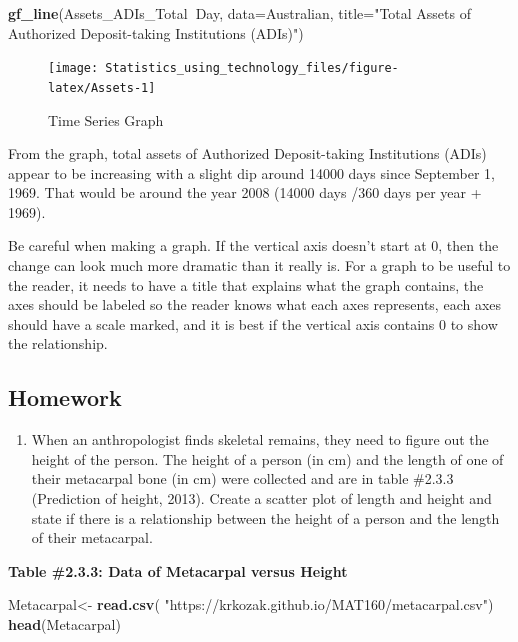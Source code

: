 \documentclass[
]{book}
\newenvironment{Shaded}{\begin{snugshade}}{\end{snugshade}}
\newcommand{\DataTypeTok}[1]{\textcolor[rgb]{0.13,0.29,0.53}{#1}}
\newcommand{\KeywordTok}[1]{\textcolor[rgb]{0.13,0.29,0.53}{\textbf{#1}}}
\newcommand{\NormalTok}[1]{#1}
\newcommand{\OperatorTok}[1]{\textcolor[rgb]{0.81,0.36,0.00}{\textbf{#1}}}
\newcommand{\StringTok}[1]{\textcolor[rgb]{0.31,0.60,0.02}{#1}}
\providecommand{\tightlist}{%
  \setlength{\itemsep}{0pt}\setlength{\parskip}{0pt}}
\begin{document}
\begin{Shaded}
\begin{Highlighting}[]
\KeywordTok{gf_line}\NormalTok{(Assets_ADIs_Total}\OperatorTok{~}\NormalTok{Day, }\DataTypeTok{data=}\NormalTok{Australian, }\DataTypeTok{title=}\StringTok{"Total Assets of Authorized Deposit-taking Institutions (ADIs)"}\NormalTok{)}
\end{Highlighting}
\end{Shaded}

\begin{figure}
\texttt{[image: Statistics\_using\_technology\_files/figure-latex/Assets-1]} \caption{Time Series Graph}\label{fig:Assets}
\end{figure}

From the graph, total assets of Authorized Deposit-taking Institutions (ADIs) appear to be increasing with a slight dip around 14000 days since September 1, 1969. That would be around the year 2008 (14000 days /360 days per year + 1969).

Be careful when making a graph. If the vertical axis doesn't start at 0, then the change can look much more dramatic than it really is. For a graph to be useful to the reader, it needs to have a title that explains what the graph contains, the axes should be labeled so the reader knows what each axes represents, each axes should have a scale marked, and it is best if the vertical axis contains 0 to show the relationship.

\hypertarget{homework-2}{%
\subsection{Homework}\label{homework-2}}

\begin{enumerate}
\def\labelenumi{\arabic{enumi}.}
\tightlist
\item
  When an anthropologist finds skeletal remains, they need to figure out the height of the person. The height of a person (in cm) and the length of one of their metacarpal bone (in cm) were collected and are in table \#2.3.3 (Prediction of height, 2013). Create a scatter plot of length and height and state if there is a relationship between the height of a person and the length of their metacarpal.
\end{enumerate}

\textbf{Table \#2.3.3: Data of Metacarpal versus Height}

\begin{Shaded}
\begin{Highlighting}[]
\NormalTok{Metacarpal<-}\StringTok{ }\KeywordTok{read.csv}\NormalTok{(}
  \StringTok{"https://krkozak.github.io/MAT160/metacarpal.csv"}\NormalTok{) }
\KeywordTok{head}\NormalTok{(Metacarpal)}
\end{Highlighting}
\end{Shaded}
\end{document}
